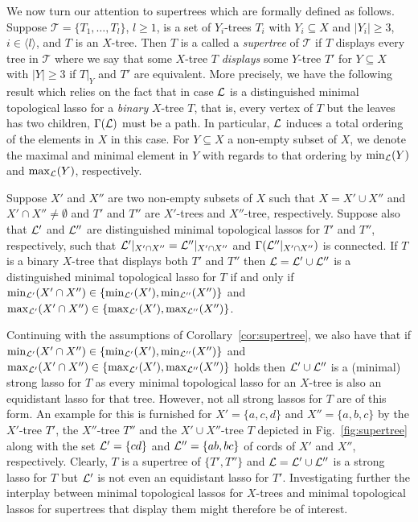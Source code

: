 We now turn our attention to supertrees which are formally defined as
follows. Suppose  $\mathcal T=\{T_1,\ldots, T_l\}$, $l\geq 1$, is a
set of $Y_i$-trees $T_i$ with $Y_i\subseteq X$ and $|Y_i|\geq 3$, 
$i\in\langle l\rangle$,
and $T$ is an $X$-tree. Then $T$ is a called a {\em supertree} 
of $\mathcal T $ if
$T$ displays every tree in $\mathcal T$
where we say that some $X$-tree $T$ {\em displays} some $Y$-tree
$T'$ for $Y\subseteq X$ with $|Y|\geq 3$ if
$T|_Y$ and $T'$ are equivalent. More precisely, we have
the following result which relies on the fact that  
in case ${\mathcal L}$ is a distinguished
minimal topological lasso for a {\em binary} $X$-tree 
$T$, that is, every vertex of $T$ but the leaves has two children, 
 $\Gamma({\mathcal L})$ must be a path. In particular, ${\mathcal L}$ induces a 
total ordering of the elements in $X$ in this case.
For $Y\subseteq X$ a non-empty subset of $X$,
we denote the maximal and minimal element in $Y$ with regards
to that ordering by $\min_{{\mathcal L}}(Y)$ and $\max_{{\mathcal L}}(Y)$, respectively.

\begin{cor}\label{cor:supertree}
Suppose $X'$ and $X''$ are two non-empty subsets 
of $X$ such that $X=X'\cup X''$ and  $X'\cap X''\not=\emptyset$
 and $T'$ and $T''$ are $X'$-trees and $X''$-tree, respectively. Suppose 
also that ${\mathcal L}'$ and ${\mathcal L}''$  are distinguished minimal topological 
lassos for $T'$ and $T''$, respectively, such that 
${\mathcal L}'|_{X'\cap X''} ={\mathcal L}''|_{X'\cap X''}$ and $\Gamma({\mathcal L}''|_{X'\cap X''})$
is connected.
If $T$ is a binary $X$-tree that displays both $T'$ and $T''$ 
then ${\mathcal L}={\mathcal L}'\cup{\mathcal L}''$ is a distinguished minimal topological 
lasso for $T$ if and only if
$\min_{{\mathcal L}'}(X'\cap X'')\in \{\min_{{\mathcal L}'}(X'), \min_{{\mathcal L}''}(X'')\}$
and $\max_{{\mathcal L}'}(X'\cap X'')\in \{\max_{{\mathcal L}'}(X'), \max_{{\mathcal L}''}(X'')\}$.
\end{cor}

Continuing with the assumptions of Corollary~\ref{cor:supertree},
we also have that if 
$\min_{{\mathcal L}'}(X'\cap X'')\in \{\min_{{\mathcal L}'}(X'), \min_{{\mathcal L}''}(X'')\}$
and $\max_{{\mathcal L}'}(X'\cap X'')\in \{\max_{{\mathcal L}'}(X'), \max_{{\mathcal L}''}(X'')\}$
holds then ${\mathcal L}'\cup {\mathcal L}''$ is a (minimal) strong lasso for $T$
as every minimal topological lasso for an $X$-tree is also
an equidistant lasso for that tree. However, not all strong 
lassos for $T$ are
of this form. An example for this is furnished for $X'=\{a,c,d\}$ 
and $X''=\{a,b,c\}$ by the $X'$-tree $T'$, the $X''$-tree 
$T''$ and the $X'\cup X''$-tree $T$ depicted in Fig.~\ref{fig:supertree}
along with the set ${\mathcal L}'=\{cd\}$  and ${\mathcal L}''=\{ab,bc\}$ of cords
of $X'$ and $X''$, respectively. Clearly,
$T$ is a supertree of $\{T',T''\}$ and ${\mathcal L}={\mathcal L}'\cup{\mathcal L}''$   
is a strong lasso for $T$ but ${\mathcal L}'$ is not even an 
equidistant lasso for $T'$. Investigating further the interplay
between minimal topological lassos for $X$-trees and minimal topological
lassos for supertrees that display them might therefore be of interest.


